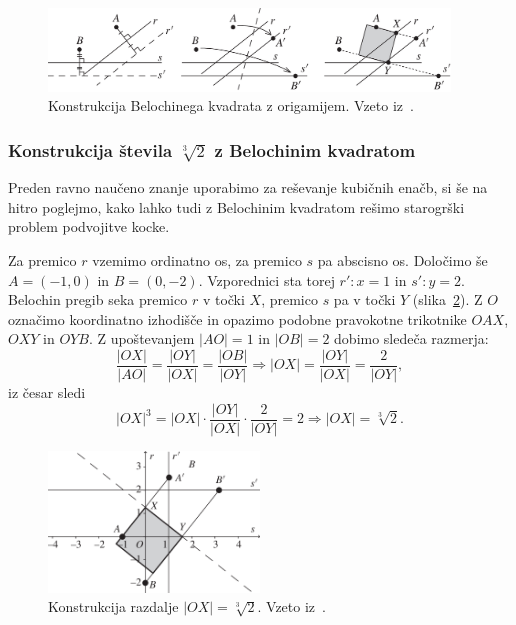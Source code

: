 \begin{figure}[h]
    \centering
    \includegraphics[width=0.95\textwidth]{images/kubična enačba/beloch_kvadrat_konstrukcija.png}
    \caption[Konstrukcija Belochinega kvadrata]{Konstrukcija Belochinega kvadrata z origamijem. Vzeto iz~\cite[str.\ 310]{hull2011}.}
    \label{fig:beloch_kvadrat_konstrukcija}
\end{figure}

\subsubsection*{Konstrukcija števila $\sqrt[3]{2}$ z Belochinim kvadratom}
\label{podpogl:beloch_kvadrat_koren}

Preden ravno naučeno znanje uporabimo za reševanje kubičnih enačb, si še na hitro poglejmo, kako lahko tudi z Belochinim kvadratom rešimo starogrški problem podvojitve kocke.

Za premico $r$ vzemimo ordinatno os, za premico $s$ pa abscisno os. Določimo še $A = (-1,0)$ in $B = (0, -2)$. Vzporednici sta torej $r': x = 1$ in $s': y = 2$. Belochin pregib seka premico $r$ v točki $X$, premico $s$ pa v točki $Y$ (slika~\ref{fig:beloch_koren}). Z $O$ označimo koordinatno izhodišče in opazimo podobne pravokotne trikotnike $OAX$, $OXY$ in $OYB$. Z upoštevanjem $|AO| = 1 $ in $|OB| = 2$ dobimo sledeča razmerja:
$$ \frac{|OX|}{|AO|} = \frac{|OY|}{|OX|} = \frac{|OB|}{|OY|} \Longrightarrow |OX| = \frac{|OY|}{|OX|} = \frac{2}{|OY|}, $$
iz česar sledi
$$ |OX|^3 = |OX| \cdot \frac{|OY|}{|OX|} \cdot \frac{2}{|OY|} = 2 \Longrightarrow |OX| = \sqrt[3]{2}. $$

\begin{figure}[h]
    \centering
    \includegraphics[width=0.5\textwidth]{images/kubična enačba/beloch_koren.png}
    \caption[Konstrukcija kubičnega korena števila dva]{Konstrukcija razdalje $|OX| = \sqrt[3]{2}$. Vzeto iz~\cite[str.\ 310]{hull2011}.}
    \label{fig:beloch_koren}
\end{figure}

